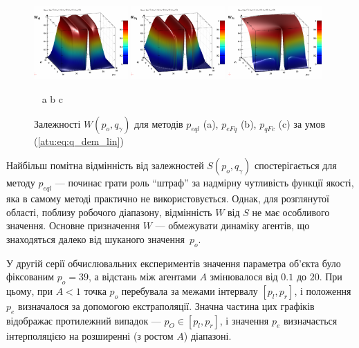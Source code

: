\begin{figure}[htb!]
  \begin{center}
    \includegraphics[width=0.32\textwidth]{p/qls_pe-p_po_qg_Wql_lin.png}
    \hfill
    \includegraphics[width=0.32\textwidth]{p/qls_pe-p_po_qg_WFq_lin.png}
    \hfill
    \includegraphics[width=0.32\textwidth]{p/qls_pe-p_po_qg_WFc_lin.png}
  \end{center}
  \vspace{-1.0ex}
  \begin{center}
    ~ \hfill a \hfill\hfill b \hfill\hfill c \hfill ~
  \end{center}
  \vspace{-1.5ex}
  \caption{Залежності $W(p_o,q_\gamma)$ для методів $p_{eql}$ (a), $p_{eFq}$ (b), $p_{qFc}$ (c) за умов (\ref{atu:eq:q_dem_lin})}
  \label{atu:f:qsl_W_po_qg_lin}
\end{figure}

Найбільш помітна відмінність від залежностей
$S(p_o, q_\gamma) $ спостерігається для методу
$p_{eql}$ --- починає грати роль ``штраф'' за надмірну
чутливість функції якості, яка в самому методі практично не
використовується. Однак, для розглянутої області, поблизу
робочого діапазону, відмінність
$W$ від
$S$ не має особливого значення. Основне призначення
$W$ --- обмежувати динаміку агентів, що знаходяться далеко від
шуканого значення~$p_o$.


У другій серії обчислювальних експериментів значення параметра об'єкта було
фіксованим $p_o = 39$, а відстань між агентами $A$ змінювалося від $0.1$
до $20$. При цьому, при $A <1$ точка $p_o$ перебувала за межами інтервалу
$[p_l, p_r]$, і положення $p_e$ визначалося за допомогою екстраполяції.
Значна частина цих графіків відображає протилежний випадок --- $p_O \in [p_l,p_r]$,
і значення $p_e$ визначається інтерполяцією на розширенні (з ростом $A$) діапазоні.

